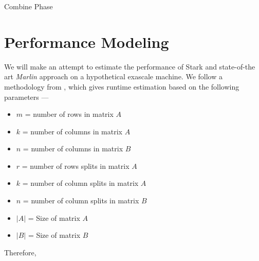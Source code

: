 \begin{algorithm}
\SetAlgoLined
{}
\caption{Combine Phase}
\label{alg:combine}
\end{algorithm}

\section{Performance Modeling}
\label{sec:Performance_Modeling}
We will make an attempt to estimate the performance of Stark and state-of-the art \textit{Marlin} approach on a hypothetical exascale machine. We follow a methodology from \cite{gu2015efficient}, which gives runtime estimation based on the following parameters ---

\begin{itemize}
    \item $m$ = number of rows in matrix $A$
    \item $k$ = number of columns in matrix $A$
    \item $n$ = number of columns in matrix $B$
    \item $r$ = number of rows splits in matrix $A$
    \item $k$ = number of column splits in matrix $A$
    \item $n$ = number of column splits in matrix $B$
    \item $\left | A \right |$ = Size of matrix $A$
    \item $\left | B \right |$ = Size of matrix $B$
\end{itemize}

Therefore,

